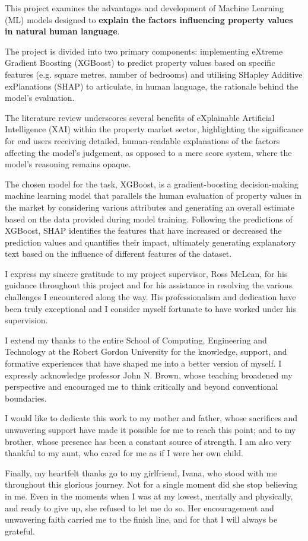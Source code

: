 \beforeabstract
{}

This project examines the advantages and development of Machine Learning (ML) models designed to \textbf{explain the factors influencing property values in natural human language}.

The project is divided into two primary components: implementing eXtreme Gradient Boosting (XGBoost) to predict property values based on specific features (e.g. square metres, number of bedrooms) and utilising SHapley Additive exPlanations (SHAP) to articulate, in human language, the rationale behind the model's evaluation. 

The literature review underscores several benefits of eXplainable Artificial Intelligence (XAI) within the property market sector, highlighting the significance for end users receiving detailed, human-readable explanations of the factors affecting the model's judgement, as opposed to a mere score system, where the model's reasoning remains opaque. 

The chosen model for the task, XGBoost, is a gradient-boosting decision-making machine learning model that parallels the human evaluation of property values in the market by considering various attributes and generating an overall estimate based on the data provided during model training. Following the predictions of XGBoost, SHAP identifies the features that have increased or decreased the prediction values and quantifies their impact, ultimately generating explanatory text based on the influence of different features of the dataset.

I express my sincere gratitude to my project supervisor, Ross McLean, for his guidance throughout this project and for his assistance in resolving the various challenges I encountered along the way. His professionalism and dedication have been truly exceptional and I consider myself fortunate to have worked under his supervision.

I extend my thanks to the entire School of Computing, Engineering and Technology at the Robert Gordon University for the knowledge, support, and formative experiences that have shaped me into a better version of myself. I expressly acknowledge professor John N. Brown, whose teaching broadened my perspective and encouraged me to think critically and beyond conventional boundaries. 

I would like to dedicate this work to my mother and father, whose sacrifices and unwavering support have made it possible for me to reach this point; and to my brother, whose presence has been a constant source of strength. I am also very thankful to my aunt, who cared for me as if I were her own child.

Finally, my heartfelt thanks go to my girlfriend, Ivana, who stood with me throughout this glorious journey. Not for a single moment did she stop believing in me. Even in the moments when I was at my lowest, mentally and physically, and ready to give up, she refused to let me do so. Her encouragement and unwavering faith carried me to the finish line, and for that I will always be grateful.

\afterpreface \afterabstract